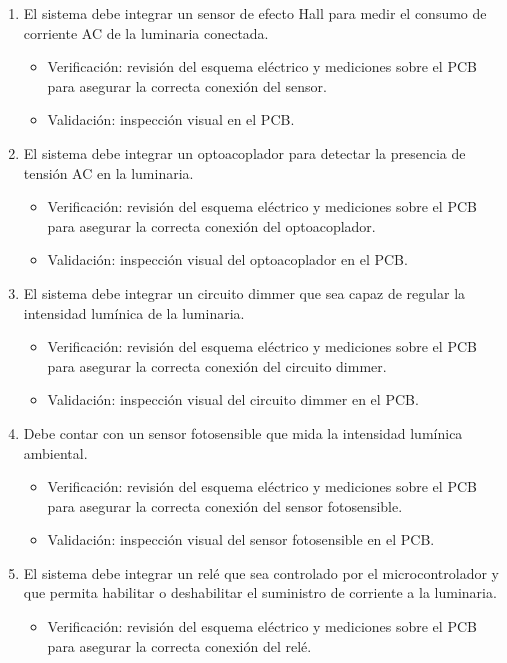 \documentclass[
11pt, %
]{charter}
\begin{document}
\begin{enumerate}
\begin{enumerate}
			\item  El sistema debe integrar un sensor de efecto Hall para medir el consumo de corriente AC de la luminaria conectada.
				\begin{itemize}
				\item Verificación: revisión del esquema eléctrico y mediciones sobre el PCB para asegurar la correcta conexión del sensor.
				\item Validación: inspección visual en el PCB.
				\end{itemize}
			\item El sistema debe integrar un optoacoplador para detectar la presencia de tensión AC en la luminaria.
				\begin{itemize}
				\item Verificación: revisión del esquema eléctrico y mediciones sobre el PCB para asegurar la correcta conexión del optoacoplador.
				\item Validación: inspección visual del optoacoplador en el PCB.
				\end{itemize}
\pagebreak
 			\item El sistema debe integrar un circuito dimmer que sea capaz de regular la intensidad lumínica de la luminaria.
				\begin{itemize}
				\item Verificación: revisión del esquema eléctrico y mediciones sobre el PCB para asegurar la correcta conexión del circuito dimmer.
				\item Validación: inspección visual del circuito dimmer en el PCB.
				\end{itemize}
			\item Debe contar con un sensor fotosensible que mida la intensidad lumínica ambiental.
				\begin{itemize}
				\item Verificación:  revisión del esquema eléctrico y mediciones sobre el PCB para asegurar la correcta conexión del sensor fotosensible. 
				\item Validación:  inspección visual del sensor fotosensible en el PCB.
				\end{itemize}
			\item El sistema debe integrar un relé que sea controlado por el microcontrolador y que permita habilitar o deshabilitar el suministro de corriente a la luminaria.
				\begin{itemize}
				\item Verificación: revisión del esquema eléctrico y mediciones sobre el PCB para asegurar la correcta conexión del relé.

\end{itemize}
\end{enumerate}
\end{enumerate}
\end{document}
